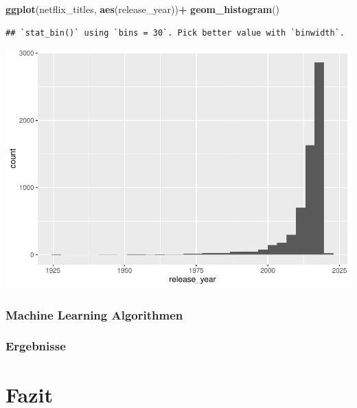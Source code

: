 \documentclass[
]{article}
\newenvironment{Shaded}{\begin{snugshade}}{\end{snugshade}}
\newcommand{\KeywordTok}[1]{\textcolor[rgb]{0.13,0.29,0.53}{\textbf{#1}}}
\newcommand{\NormalTok}[1]{#1}
\newcommand{\OperatorTok}[1]{\textcolor[rgb]{0.81,0.36,0.00}{\textbf{#1}}}
\newcommand{\StringTok}[1]{\textcolor[rgb]{0.31,0.60,0.02}{#1}}
\begin{document}
\begin{Shaded}
\begin{Highlighting}[]
\KeywordTok{ggplot}\NormalTok{(netflix_titles, }\KeywordTok{aes}\NormalTok{(release_year))}\OperatorTok{+}
\StringTok{  }\KeywordTok{geom_histogram}\NormalTok{()}
\end{Highlighting}
\end{Shaded}

\begin{verbatim}
## `stat_bin()` using `bins = 30`. Pick better value with `binwidth`.
\end{verbatim}

\includegraphics{Projektbericht_files/figure-latex/unnamed-chunk-1-1.pdf}

\hypertarget{machine-learning-algorithmen}{%
\subsubsection{Machine Learning
Algorithmen}\label{machine-learning-algorithmen}}

\hypertarget{ergebnisse}{%
\subsubsection{Ergebnisse}\label{ergebnisse}}

\hypertarget{fazit}{%
\section{Fazit}\label{fazit}}
\end{document}
